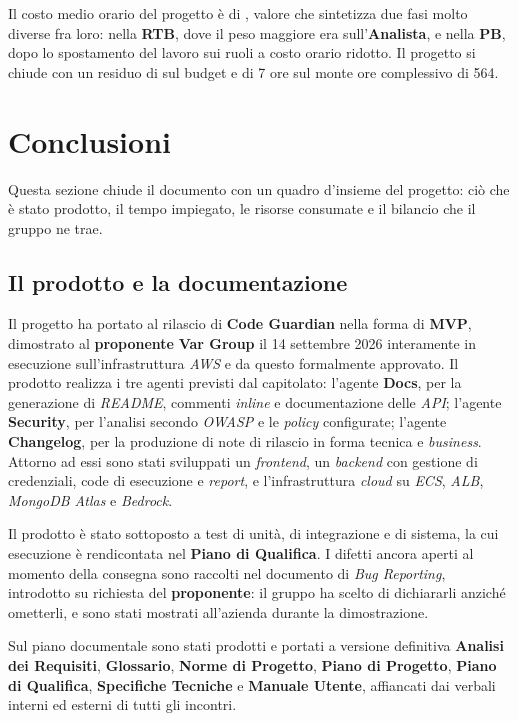\documentclass[12pt, a4paper]{article}
\begin{document}
{Il costo medio orario del progetto è di , valore che sintetizza due fasi molto diverse fra loro:  nella \textbf{RTB}, dove il peso maggiore era sull'\textbf{Analista}, e  nella \textbf{PB}, dopo lo spostamento del lavoro sui ruoli a costo orario ridotto. Il progetto si chiude con un residuo di  sul budget e di 7 ore sul monte ore complessivo di 564.

\newpage
\section{Conclusioni}
Questa sezione chiude il documento con un quadro d'insieme del progetto: ciò che è stato prodotto, il tempo impiegato, le risorse consumate e il bilancio che il gruppo ne trae.

\subsection{Il prodotto e la documentazione}
Il progetto ha portato al rilascio di \textbf{Code Guardian} nella forma di \textbf{MVP}, dimostrato al \textbf{proponente} \textbf{Var Group} il 14 settembre 2026 interamente in esecuzione sull'infrastruttura \textit{AWS} e da questo formalmente approvato. Il prodotto realizza i tre agenti previsti dal capitolato: l'agente \textbf{Docs}, per la generazione di \textit{README}, commenti \textit{inline} e documentazione delle \textit{API}; l'agente \textbf{Security}, per l'analisi secondo \textit{OWASP} e le \textit{policy} configurate; l'agente \textbf{Changelog}, per la produzione di note di rilascio in forma tecnica e \textit{business}. Attorno ad essi sono stati sviluppati un \textit{frontend}, un \textit{backend} con gestione di credenziali, code di esecuzione e \textit{report}, e l'infrastruttura \textit{cloud} su \textit{ECS}, \textit{ALB}, \textit{MongoDB Atlas} e \textit{Bedrock}.

Il prodotto è stato sottoposto a test di unità, di integrazione e di sistema, la cui esecuzione è rendicontata nel \textbf{Piano di Qualifica}. I difetti ancora aperti al momento della consegna sono raccolti nel documento di \textit{Bug Reporting}, introdotto su richiesta del \textbf{proponente}: il gruppo ha scelto di dichiararli anziché ometterli, e sono stati mostrati all'azienda durante la dimostrazione.

Sul piano documentale sono stati prodotti e portati a versione definitiva \textbf{Analisi dei Requisiti}, \textbf{Glossario}, \textbf{Norme di Progetto}, \textbf{Piano di Progetto}, \textbf{Piano di Qualifica}, \textbf{Specifiche Tecniche} e \textbf{Manuale Utente}, affiancati dai verbali interni ed esterni di tutti gli incontri.

}
\end{document}
